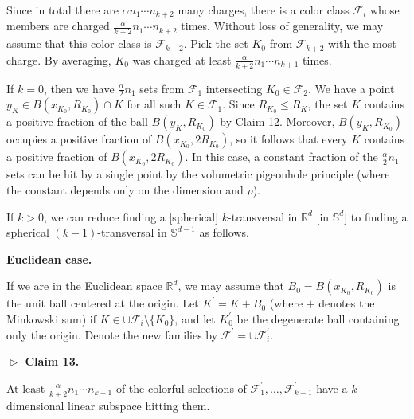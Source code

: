 \par
\par
Since in total there are $\alpha n_{1}\cdots n_{k+2}$ many charges, there is a color class $\mathcal{F}_{i}$ whose members are charged $\frac{\alpha}{k+2}n_{1}\cdots n_{k+2}$ times. Without loss of generality, we may assume that this color class is $\mathcal{F}_{k+2}$. Pick the set $K_{0}$ from $\mathcal{F}_{k+2}$ with the most charge. By averaging, $K_{0}$ was charged at least $\frac{\alpha}{k+2}n_{1}\cdots n_{k+1}$ times.
\par
\par
If $k=0$, then we have $\frac{\alpha}{2}n_{1}$ sets from $\mathcal{F}_{1}$ intersecting $K_{0}\in\mathcal{F}_{2}$. We have a point $y_{K}\in B(x_{K_{0}},R_{K_{0}})\cap K$ for all such $K\in\mathcal{F}_{1}$. Since $R_{K_{0}}\leq R_{K}$, the set $K$ contains a positive fraction of the ball $B(y_{K},R_{K_{0}})$ by Claim 12. Moreover, $B(y_{K},R_{K_{0}})$ occupies a positive fraction of $B(x_{K_{0}},2R_{K_{0}})$, so it follows that every $K$ contains a positive fraction of $B(x_{K_{0}},2R_{K_{0}})$. In this case, a constant fraction of the $\frac{\alpha}{2}n_{1}$ sets can be hit by a single point by the volumetric pigeonhole principle (where the constant depends only on the dimension and $\rho$).
\par
\par
If $k>0$, we can reduce finding a [spherical] $k$-transversal in $\mathbb{R}^{d}$ [in $\mathbb{S}^{d}$] to finding a spherical $(k-1)$-transversal in $\mathbb{S}^{d-1}$ as follows.
\par
\par
\par
\par\medskip\noindent\textbf{Euclidean case.}\par
If we are in the Euclidean space $\mathbb{R}^{d}$, we may assume that $B_{0}=B(x_{K_{0}},R_{K_{0}})$ is the unit ball centered at the origin. Let $K^{\prime}=K+B_{0}$ (where $+$ denotes the Minkowski sum) if $K\in\cup\mathcal{F}_{i}\setminus\{K_{0}\}$, and let $K_{0}^{\prime}$ be the degenerate ball containing only the origin. Denote the new families by $\mathcal{F}^{\prime}=\cup\mathcal{F}_{i}^{\prime}$.
\par
\par
\par\medskip\noindent\textbf{$\vartriangleright$ Claim 13.}\par
At least $\frac{\alpha}{k+2}n_{1}\cdots n_{k+1}$ of the colorful selections of $\mathcal{F}_{1}^{\prime},\ldots,\mathcal{F}_{k+1}^{\prime}$ have a $k$-dimensional linear subspace hitting them.
